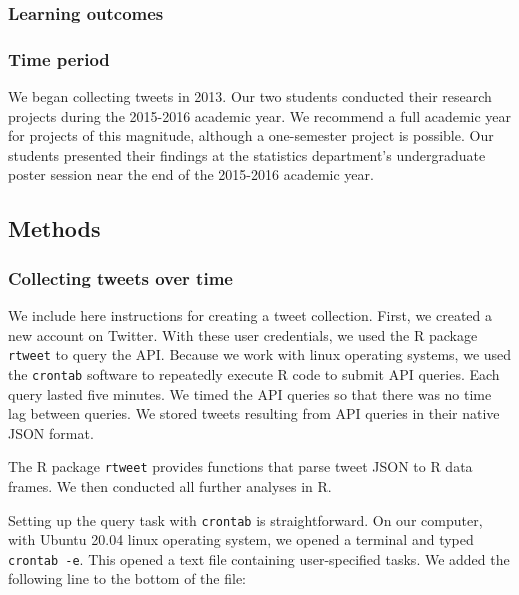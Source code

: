 \documentclass[
]{article}
\begin{document}
\hypertarget{learning-outcomes}{%
\subsubsection{Learning outcomes}\label{learning-outcomes}}

\hypertarget{time-period}{%
\subsubsection{Time period}\label{time-period}}

We began collecting tweets in 2013. Our two students conducted their
research projects during the 2015-2016 academic year. We recommend a
full academic year for projects of this magnitude, although a
one-semester project is possible. Our students presented their findings
at the statistics department's undergraduate poster session near the end
of the 2015-2016 academic year.

\hypertarget{methods}{%
\subsection{Methods}\label{methods}}

\hypertarget{collecting-tweets-over-time}{%
\subsubsection{Collecting tweets over
time}\label{collecting-tweets-over-time}}

We include here instructions for creating a tweet collection. First, we
created a new account on Twitter. With these user credentials, we used
the R package \texttt{rtweet} to query the API. Because we work with
linux operating systems, we used the \texttt{crontab} software to
repeatedly execute R code to submit API queries. Each query lasted five
minutes. We timed the API queries so that there was no time lag between
queries. We stored tweets resulting from API queries in their native
JSON format.

The R package \texttt{rtweet} provides functions that parse tweet JSON
to R data frames. We then conducted all further analyses in R.

Setting up the query task with \texttt{crontab} is straightforward. On
our computer, with Ubuntu 20.04 linux operating system, we opened a
terminal and typed \texttt{crontab\ -e}. This opened a text file
containing user-specified tasks. We added the following line to the
bottom of the file:
\end{document}
